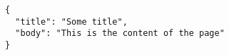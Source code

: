 \begin{verbatim}
{
  "title": "Some title",
  "body": "This is the content of the page"
}
\end{verbatim}
